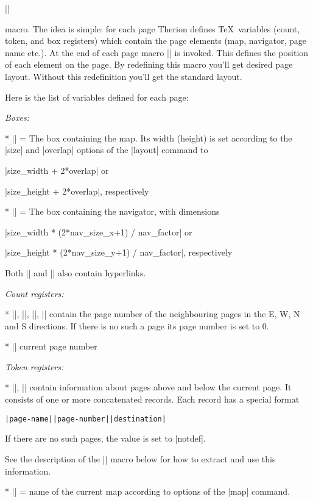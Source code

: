 |\dopage|

macro. The idea is simple: for each page Therion defines \TeX\ variables 
(count, token, and box registers) which contain the page elements (map, 
navigator, page name etc.). At the end of each page macro |\dopage| is invoked. 
This defines the position of each element on the page. By redefining this macro 
you'll get desired page layout. Without this redefinition you'll get the 
standard layout.

Here is the list of variables defined for each page:

\list
  {\it Boxes:}

  * |\mapbox| = The box containing the map. Its width (height) is set 
    according to the |size| and |overlap| options of the |layout| command to 

    |size_width + 2*overlap| or 
    
    |size_height + 2*overlap|, respectively

  * |\navbox| = The box containing the navigator, with dimensions

    |size_width * (2*nav_size_x+1) / nav_factor| or

    |size_height * (2*nav_size_y+1) / nav_factor|, respectively

    Both |\mapbox| and |\navbox| also contain hyperlinks.

  {\it Count registers:}

  * |\pointerE|, |\pointerW|, |\pointerN|, |\pointerS| contain the page number 
    of the neighbouring pages in the E, W, N and S directions. If there is no 
    such a page its page number is set to 0.

  * |\pagenum| current page number

  {\it Token registers:}

  * |\pointerU|, |\pointerD| contain information about pages above and below
    the current page. It consists of one or more concatenated records. Each 
    record has a special format
    
    {\tt|page-name||page-number||destination|}
    
    If there are no such pages, the value is set to |notdef|.

    See the description of the |\processpointeritem| macro below for how to 
    extract and use this information.

  * |\pagename| = name of the current map according to options of the |map|
    command.

